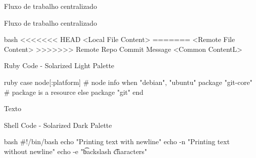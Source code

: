 \documentclass[aspectratio=169]{beamer} %
\begin{document}
\begin{SliTC}{Fluxo de trabalho centralizado}
\begin{itemize}


    \begin{itemize}
    

    \end{itemize}

\end{itemize}


\end{SliTC}


\begin{SliTC}{Fluxo de trabalho centralizado}
\begin{itemize}


    \begin{itemize}
    

    \end{itemize}

\end{itemize}

\begin{CodeD}{bash}
<<<<<<< HEAD
<Local File Content>
=======
<Remote File Content>
>>>>>>> Remote Repo Commit Message
<Common ContentL>
\end{CodeD}

\end{SliTC}




\begin{SliTC}{Ruby Code - Solarized Light Palette}
    \begin{CodeL}{ruby}
case node[:platform] # node info
when "debian", "ubuntu"
  package "git-core" # package is a resource
else 
  package "git"
end
    \end{CodeL}
    Texto
\end{SliTC}

\begin{SliTC}{Shell Code - Solarized Dark Palette}
    \begin{CodeD2}{bash}
#!/bin/bash
echo "Printing text with newline"
echo -n "Printing text without newline"
echo -e "\nRemoving \t backslash \t characters\n"
    \end{CodeD2}
\end{SliTC}
\end{document}
